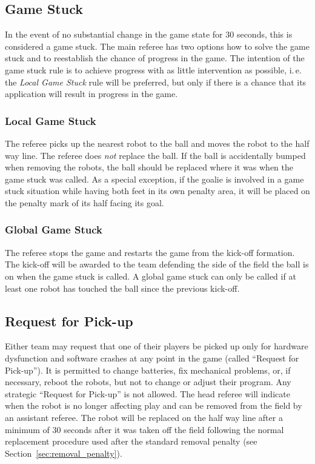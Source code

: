 \documentclass[12pt]{article}
\newcommand{\ie}{\mbox{i.\,e.}\xspace}
\begin{document}
\subsection{Game Stuck}

In the event of no substantial change in the game state for 30 seconds, this is considered a game stuck. The main referee has two options how to solve the game stuck and to reestablish the chance of progress in the game. The intention of the game stuck rule is to achieve progress with as little intervention as possible, \ie the \emph{Local Game Stuck} rule will be preferred, but only if there is a chance that its application will result in progress in the game.

\subsubsection{Local Game Stuck}

The referee picks up the nearest robot to the ball and moves the robot to the half way line. The referee does \emph{not} replace the ball. If the ball is accidentally bumped when removing the robots, the ball should be replaced where it was when the game stuck was called. As a special exception, if the goalie is involved in a game stuck situation while having both feet in its own penalty area, it will be placed on the penalty mark of its half facing its goal.

\subsubsection{Global Game Stuck}

The referee stops the game and restarts the game from the kick-off formation. The kick-off will be awarded to the team defending the side of the field the ball is on when the game stuck is called. A global game stuck can only be called if at least one robot has touched the ball since the previous kick-off.

\subsection{Request for Pick-up}

Either team may request that one of their players be picked up only for hardware dysfunction and software crashes at any point in the game (called ``Request for Pick-up''). It is permitted to change batteries, fix mechanical problems, or, if necessary, reboot the robots, but not to change or adjust their program. Any strategic ``Request for Pick-up'' is not allowed. The head referee will indicate when the robot is no longer affecting play and can be removed from the field by an assistant referee. The robot will be replaced on the half way line after a minimum of 30 seconds after it was taken off the field following the normal replacement procedure used after the standard removal penalty (see Section~\ref{sec:removal_penalty}).
\end{document}
